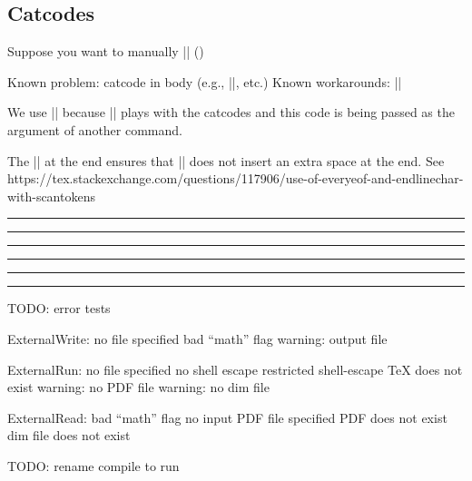 \documentclass[10pt]{ltxdoc}
\newcommand{\showfile}[1]{
  \begin{tcolorbox}[title=\texttt{#1}]
  
  \end{tcolorbox}
}
\def\gauge{%
  \rule{0.2em}{7pt}%
  \llap{\rule[8pt]{0.2em}{2pt}}%
}
\begin{document}
\begin{tcblisting}{}
\ExternalRun[file=example-standalone-hash]
\ExternalRead[file=example-standalone-hash]
\end{tcblisting}

\subsection{Catcodes}

Suppose you want to manually |\vDash| (\external[file=example-inline-vdash,preamble={\usepackage{amssymb}}]{$\vDash$})

Known problem: catcode in body (e.g., |\DeclareFont|, etc.)
Known workarounds: |\scantokens|

We use |\scantokens| because |\DeclareFontShape| plays with the
catcodes and this code is being passed as the argument of another
command.

The |\relax| at the end ensures that |\scantokens| does not
insert an extra space at the end.
See https://tex.stackexchange.com/questions/117906/use-of-everyeof-and-endlinechar-with-scantokens

\begin{tcblisting}{}
\gauge
{}%
\gauge
\end{tcblisting}

\showfile{example-standalone-catcode.tex}

\begin{tcblisting}{}
\gauge\ExternalRun[file=example-standalone-catcode]\gauge

\gauge\ExternalRead[file=example-standalone-catcode]\gauge
\end{tcblisting}

TODO: error tests

ExternalWrite:
  no file specified
  bad ``math'' flag
  warning: output file

ExternalRun:
  no file specified
  no shell escape
  restricted shell-escape
  TeX does not exist
  warning: no PDF file
  warning: no dim file

ExternalRead:
  bad ``math'' flag
  no input PDF file specified
  PDF does not exist
  dim file does not exist

TODO: rename compile to run
\end{document}
